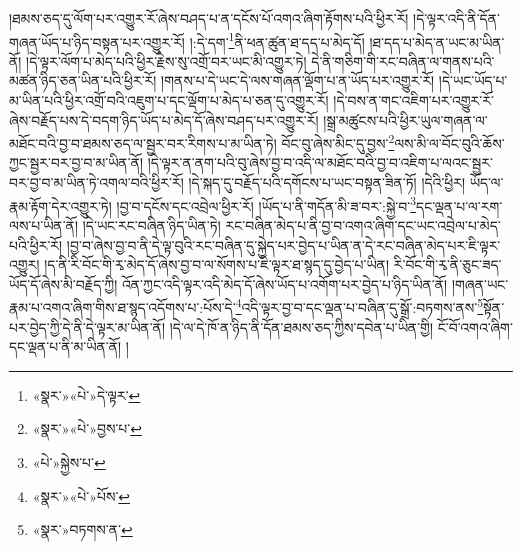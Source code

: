 །ཐམས་ཅད་དུ་ལོག་པར་འགྱུར་རོ་ཞེས་བཤད་པ་ན་དངོས་པོ་འགའ་ཞིག་རྟོགས་པའི་ཕྱིར་རོ། །དེ་ལྟར་འདི་ནི་དོན་གཞན་ཡོད་པ་ཉིད་བསྟན་པར་འགྱུར་རོ། །:དེ་དག་\footnote{«སྣར་»«པེ་»དེ་ལྟར་}ནི་ཕན་ཚུན་ཐ་དད་པ་མེད་དོ། །ཐ་དད་པ་མེད་ན་ཡང་མ་ཡིན་ནོ། །དེ་ལྟར་ལོག་པ་མེད་པའི་ཕྱིར་རྗེས་སུ་འགྲོ་བར་ཡང་མི་འགྱུར་ཏེ། དེ་ནི་གཅིག་གི་རང་བཞིན་ལ་གནས་པའི་མཚན་ཉིད་ཅན་ཡིན་པའི་ཕྱིར་རོ། །གནས་པ་དེ་ཡང་དེ་ལས་གཞན་ལྡོག་པ་ན་ཡོད་པར་འགྱུར་རོ། །དེ་ཡང་ཡོད་པ་མ་ཡིན་པའི་ཕྱིར་འགྲོ་བའི་འཇུག་པ་དང་ལྡོག་པ་མེད་པ་ཅན་དུ་འགྱུར་རོ། །དེ་བས་ན་གང་འཇིག་པར་འགྱུར་རོ་ཞེས་བརྗོད་པས་དེ་བདག་ཉིད་ཡོད་པ་མེད་དོ་ཞེས་བཤད་པར་འགྱུར་རོ། །སྒྲ་མཚུངས་པའི་ཕྱིར་ཡུལ་གཞན་ལ་མཐོང་བའི་བྱ་བ་ཐམས་ཅད་ལ་སྦྱར་བར་རིགས་པ་མ་ཡིན་ཏེ། བོང་བུ་ཞེས་མིང་དུ་བྱས་\footnote{«སྣར་»«པེ་»བྱས་པ་}ལས་མི་ལ་བོང་བུའི་ཆོས་ཀྱང་སྦྱར་བར་བྱ་བ་མ་ཡིན་ནོ། །དེ་ལྟར་ན་ནག་པའི་བུ་ཞེས་བྱ་བ་འདི་ལ་མཐོང་བའི་བྱ་བ་འཇིག་པ་ལའང་སྦྱར་བར་བྱ་བ་མ་ཡིན་ཏེ་འགལ་བའི་ཕྱིར་རོ། །དེ་སྐད་དུ་བརྗོད་པའི་དགོངས་པ་ཡང་བསྟན་ཟིན་ཏོ། །དེའི་ཕྱིར། ཡོད་ལ་རྣམ་རྟོག་དེར་འགྱུར་ཏེ། །བྱ་བ་དངོས་དང་འབྲེལ་ཕྱིར་རོ། །ཡོད་པ་ནི་གདོན་མི་ཟ་བར་:སྐྱེ་བ་\footnote{«པེ་»སྐྱེས་པ་}དང་ལྡན་པ་ལ་རག་ལས་པ་ཡིན་ནོ། །དེ་ཡང་རང་བཞིན་ཉིད་ཡིན་ཏེ། རང་བཞིན་མེད་པ་ནི་བྱ་བ་འགའ་ཞིག་དང་ཡང་འབྲེལ་པ་མེད་པའི་ཕྱིར་རོ། །བྱ་བ་ཞེས་བྱ་བ་ནི་དེ་ལྟ་བུའི་རང་བཞིན་དུ་སྐྱེད་པར་བྱེད་པ་ཡིན་ན་དེ་རང་བཞིན་མེད་པར་ཇི་ལྟར་འགྱུར། །ད་ནི་རི་བོང་གི་རྭ་མེད་དོ་ཞེས་བྱ་བ་ལ་སོགས་པ་ཇི་ལྟར་ཐ་སྙད་དུ་བྱེད་པ་ཡིན། རི་བོང་གི་རྭ་ནི་ཅུང་ཟད་ཡོད་དོ་ཞེས་མི་བརྗོད་ཀྱི། འོན་ཀྱང་འདི་ལྟར་འདི་མེད་དོ་ཞེས་ཡོད་པ་འགོག་པར་བྱེད་པ་ཉིད་ཡིན་ནོ། །གཞན་ཡང་རྣམ་པ་འགའ་ཞིག་གིས་ཐ་སྙད་འདོགས་པ་:པོས་དེ་\footnote{«སྣར་»«པེ་»པོས་}འདི་ལྟར་བྱ་བ་དང་ལྡན་པ་བཞིན་དུ་སྒྲོ་:བཏགས་ནས་\footnote{«སྣར་»བཏགས་ན་}སྟོན་པར་བྱེད་ཀྱི་དེ་ནི་དེ་ལྟར་མ་ཡིན་ནོ། །དེ་ལ་དེ་ཁོ་ན་ཉིད་ནི་དོན་ཐམས་ཅད་ཀྱིས་དབེན་པ་ཡིན་གྱི། ངོ་བོ་འགའ་ཞིག་དང་ལྡན་པ་ནི་མ་ཡིན་ནོ། །
